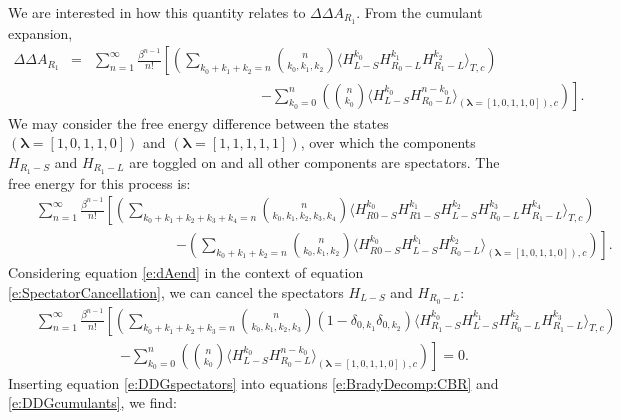 \documentclass[%
 preprint,
 amsmath,amssymb,
 aps,
]{revtex4-1}
\renewcommand{\vec}[1]{{\mathbf{#1}}}
\begin{document}
 
We are interested in how this quantity relates to $\Delta \Delta A_{R_1}$.  From the cumulant expansion, 
 \begin{eqnarray}
 \Delta \Delta A_{R_1} &=&
 \sum_{n=1}^{\infty}  \frac{\beta^{n-1}}{n!} 
\left[
\left(
 \sum_{k_0+k_1+k_2=n} 
{ n \choose k_0,k_1,k_2 } \langle  H_{L-S}^{k_0} H_{R_0-L}^{k_1} H_{R_1-L}^{k_2} 
\rangle_{T,c}
\right) \right.  \label{e:DDGcumulants} \\ && \qquad \qquad \qquad \qquad \qquad \qquad \left. 
- 
 \sum_{k_0=0}^n 
\left( {n \choose k_0 } \langle  H_{L-S}^{k_0} H_{R_0-L}^{n-k_0} \rangle_{\left(\vec{\lambda}=\left[1,0,1,1,0\right] \right),c}
\right)
\right]. \nonumber
 \end{eqnarray}
We may consider the free energy difference between the states $\left(\vec{\lambda}=\left[1,0,1,1,0\right] \right)$ and 
$\left(\vec{\lambda}=\left[1,1,1,1,1\right] \right)$, over which the components $H_{R_1-S}$ and $H_{R_1-L}$ are toggled on and all other components are spectators.  The free energy for this process is:
 \begin{eqnarray}
 &&
 \sum_{n=1}^{\infty}  \frac{\beta^{n-1}}{n!} 
\left[
\left(
 \sum_{k_0+k_1+k_2+k_3+k_4=n} 
{ n \choose k_0,k_1,k_2,k_3,k_4 } \langle  H_{R0-S}^{k_0}H_{R1-S}^{k_1}H_{L-S}^{k_2} H_{R_0-L}^{k_3} H_{R_1-L}^{k_4} 
\rangle_{T,c}
\right) \right.  \label{e:dAend} \\ && \qquad \qquad \qquad \qquad \qquad  \left. 
- 
\left(
 \sum_{k_0+k_1+k_2=n} 
{ n \choose k_0,k_1,k_2 } \langle  H_{R0-S}^{k_0} H_{L-S}^{k_1} H_{R_0-L}^{k_2} 
\rangle_{\left(\vec{\lambda}=\left[1,0,1,1,0\right] \right),c}
\right) 
\right]. \nonumber
 \end{eqnarray}
%
Considering equation \ref{e:dAend} in the context of equation \ref{e:SpectatorCancellation}, we can cancel the spectators $H_{L-S}$ and $H_{R_0-L}$:
 \begin{eqnarray}
 &&
\sum_{n=1}^{\infty}  \frac{\beta^{n-1}}{n!} 
\left[
\left(
 \sum_{k_0+k_1+k_2+k_3=n} 
{ n \choose k_0,k_1,k_2,k_3} \left( 1- \delta_{0,k_1} \delta_{0,k_2}  \right) \langle  
H_{R_1-S}^{k_0}H_{L-S}^{k_1} H_{R_0-L}^{k_2} H_{R_1-L}^{k_3} 
\rangle_{T,c}
\right) \right. \label{e:DDGspectators} \\ && \qquad \qquad \qquad \left. 
- 
\sum_{k_0=0}^n 
\left( {n \choose k_0 } \langle  H_{L-S}^{k_0} H_{R_0-L}^{n-k_0} \rangle_{\left(\vec{\lambda}=\left[1,0,1,1,0\right] \right),c}
\right)
\right] = 0. \nonumber
\end{eqnarray}
Inserting equation \ref{e:DDGspectators} into equations \ref{e:BradyDecomp:CBR} and \ref{e:DDGcumulants}, we find:
\end{document}
